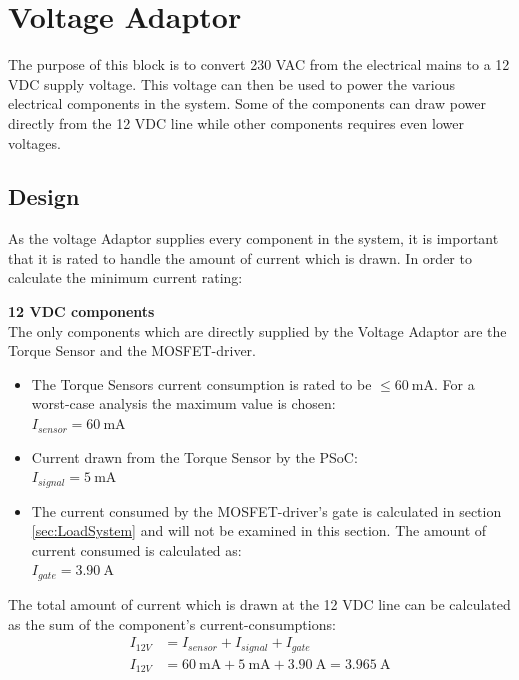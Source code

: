 \section{Voltage Adaptor}
The purpose of this block is to convert 230 VAC from the electrical mains to a 12 VDC supply voltage. This voltage can then be used to power the various electrical components in the system. Some of the components can draw power directly from the 12 VDC line while other components requires even lower voltages.

\subsection{Design} 
As the voltage Adaptor supplies every component in the system, it is important that it is rated to handle the amount of current which is drawn.
In order to calculate the minimum current rating:

\textbf{12 VDC components}\\
The only components which are directly supplied by the Voltage Adaptor are the Torque Sensor and the MOSFET-driver.

\begin{itemize}
	\item The Torque Sensors current consumption is rated to be $\leq  \SI{60}{\milli \ampere}$. For a worst-case analysis the maximum value is chosen:\\
	$I_{sensor} = \SI{60}{\milli \ampere}$
	\item Current drawn from the Torque Sensor by the PSoC:\\
	$I_{signal} = \SI{5}{\milli \ampere}$
	\item The current consumed by the MOSFET-driver's gate is calculated in section \vref{sec:LoadSystem} and will not be examined in this section. The amount of current consumed is calculated as:\\
	$I_{gate} = \SI{3.90}{\ampere}$
\end{itemize}

The total amount of current which is drawn at the 12 VDC line can be calculated as the sum of the component's current-consumptions:
\begin{equation}
	\begin{split}
		I_{12V} &= I_{sensor} + I_{signal} + I_{gate}\\
		I_{12V} &= \SI{60}{\milli \ampere} + \SI{5}{\milli \ampere} + \SI{3.90}{\ampere} = \SI{3.965}{\ampere}
	\end{split}
\end{equation}

